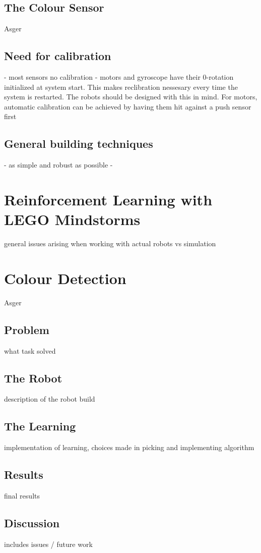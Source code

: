 \documentclass[11pt, a4paper]{article}
\begin{document}
\subsection{The Colour Sensor}
Asger

\subsection{Need for calibration}
- most sensors no calibration
- motors and gyroscope have their 0-rotation initialized at system start. This makes reclibration nessesary every time the system is restarted. The robots should be designed with this in mind. For motors, automatic calibration can be achieved by having them hit against a push sensor first

\subsection{General building techniques}
- as simple and robust as possible
- 

\section{Reinforcement Learning with LEGO Mindstorms}
general issues arising when working with actual robots vs simulation

\section{Colour Detection}
Asger
\subsection{Problem}
what task solved
\subsection{The Robot}
description of the robot build
\subsection{The Learning}
implementation of learning, choices made in picking and implementing algorithm
\subsection{Results}
final results
\subsection{Discussion}
includes issues / future work
\end{document}
